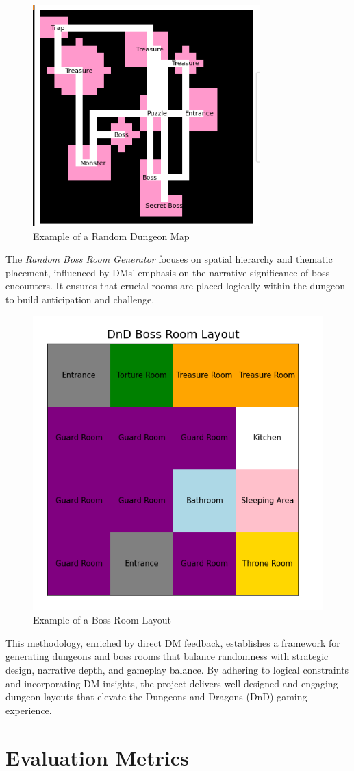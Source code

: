 \documentclass[10pt,twocolumn]{article}
\begin{document}
\begin{figure}[h]
\centering
\includegraphics[width=0.5\linewidth]{mymap.png}
\caption{Example of a Random Dungeon Map}
\label{fig:dungeon-map}
\end{figure}

The \textit{Random Boss Room Generator} focuses on spatial hierarchy and thematic placement, influenced by DMs' emphasis on the narrative significance of boss encounters. It ensures that crucial rooms are placed logically within the dungeon to build anticipation and challenge.

\begin{figure}[h]
\centering
\includegraphics[width=0.5\linewidth]{bossmap.png}
\caption{Example of a Boss Room Layout}
\label{fig:boss-room}
\end{figure}

This methodology, enriched by direct DM feedback, establishes a framework for generating dungeons and boss rooms that balance randomness with strategic design, narrative depth, and gameplay balance. By adhering to logical constraints and incorporating DM insights, the project delivers well-designed and engaging dungeon layouts that elevate the Dungeons and Dragons (DnD) gaming experience.

\section{Evaluation Metrics}
\end{document}
